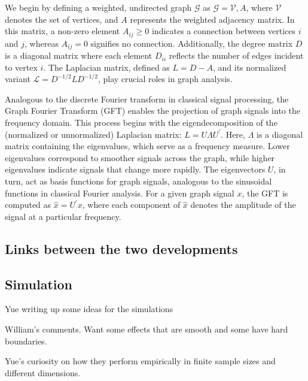 \documentclass[12pt]{article}
\begin{document}
We begin by defining a weighted, undirected graph $\mathcal{G}$ as $\mathcal{G} = {\mathcal{V}, A}$, where $\mathcal{V}$ denotes the set of vertices, and $A$ represents the weighted adjacency matrix. In this matrix, a non-zero element $A_{ij} \geq 0$ indicates a connection between vertices $i$ and $j$, whereas $A_{ij} = 0$ signifies no connection. Additionally, the degree matrix $D$ is a diagonal matrix where each element $D_{ii}$ reflects the number of edges incident to vertex $i$. The Laplacian matrix, defined as $L = D - A$, and its normalized variant $\mathcal{L} = D^{-1/2}LD^{-1/2}$, play crucial roles in graph analysis.

Analogous to the discrete Fourier transform in classical signal processing, the Graph Fourier Transform (GFT) enables the projection of graph signals into the frequency domain. This process begins with the eigendecomposition of the (normalized or unnormalized) Laplacian matrix: $L = U\Lambda U^{\prime}$. Here, $\Lambda$ is a diagonal matrix containing the eigenvalues, which serve as a frequency measure. Lower eigenvalues correspond to smoother signals across the graph, while higher eigenvalues indicate signals that change more rapidly. The eigenvectors $U$, in turn, act as basis functions for graph signals, analogous to the sinusoidal functions in classical Fourier analysis. For a given graph signal $x$, the GFT is computed as $\hat{x} = U^{\prime} x$, where each component of $\hat{x}$ denotes the amplitude of the signal at a particular frequency.

\subsection{Links between the two developments}

\subsection{Simulation}
Yue writing up some ideas for the simulations

William's comments.  Want some effects that are smooth and some have hard boundaries.

Yue's curiosity on how they perform empirically in finite sample sizes and different dimensions.
\end{document}
